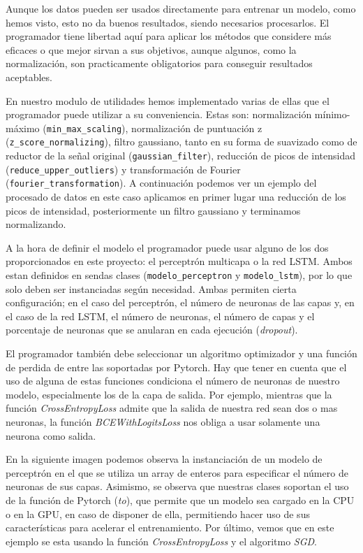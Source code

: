 Aunque los datos pueden ser usados directamente para entrenar un modelo, como hemos visto, esto no da buenos resultados, siendo necesarios procesarlos. El programador tiene libertad aquí para aplicar los métodos que considere más eficaces o que mejor sirvan a sus objetivos, aunque algunos, como la normalización, son practicamente obligatorios para conseguir resultados aceptables. 

En nuestro modulo de utilidades hemos implementado varias de ellas que el programador puede utilizar a su conveniencia. Estas son: normalización mínimo-máximo (\texttt{min\_max\_scaling}), normalización de puntuación z (\texttt{z\_score\_normalizing}), filtro gaussiano, tanto en su forma de suavizado como de reductor de la señal original (\texttt{gaussian\_filter}), reducción de picos de intensidad (\texttt{reduce\_upper\_outliers}) y transformación de Fourier (\texttt{fourier\_transformation}). A continuación podemos ver un ejemplo del procesado de datos en este caso aplicamos en primer lugar una reducción de los picos de intensidad, posteriormente un filtro gaussiano y terminamos normalizando.


A la hora de definir el modelo el programador puede usar alguno de los dos proporcionados en este proyecto: el perceptrón multicapa o la red LSTM. Ambos estan definidos en sendas clases (\texttt{modelo\_perceptron} y \texttt{modelo\_lstm}), por lo que solo deben ser instanciadas según necesidad. Ambas permiten cierta configuración; en el caso del perceptrón, el número de neuronas de las capas y, en el caso de la red LSTM, el número de neuronas, el número de capas y el porcentaje de neuronas que se anularan en cada ejecución (\textit{dropout}). 

El programador también debe seleccionar un algoritmo optimizador y una función de perdida de entre las soportadas por Pytorch. Hay que tener en cuenta que el uso de alguna de estas funciones condiciona el número de neuronas de nuestro modelo, especialmente los de la capa de salida. Por ejemplo, mientras que la función \textit{CrossEntropyLoss} admite que la salida de nuestra red sean dos o mas neuronas, la función \textit{BCEWithLogitsLoss} nos obliga a usar solamente una neurona como salida.

En la siguiente imagen podemos observa la instanciación de un modelo de perceptrón en el que se utiliza un array de enteros para especificar el número de neuronas de sus capas. Asimismo, se observa que nuestras clases soportan el uso de la función de Pytorch (\textit{to}), que permite que un modelo sea cargado en la CPU o en la GPU, en caso de disponer de ella, permitiendo hacer uso de sus características para acelerar el entrenamiento. Por último, vemos que en este ejemplo se esta usando la función \textit{CrossEntropyLoss} y el algoritmo \textit{SGD}.

